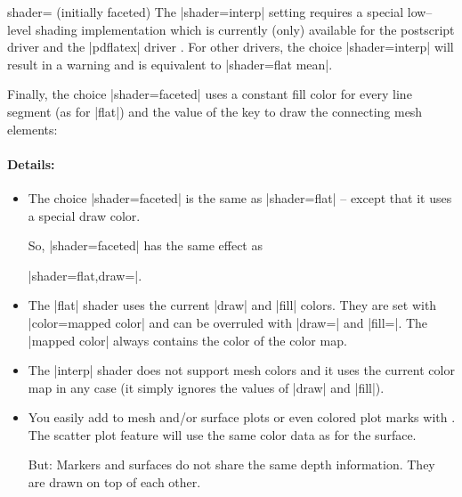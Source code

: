 \begin{pgfplotskey}{shader= (initially faceted)}
	The |shader=interp| setting requires a special low--level shading implementation which is currently (only) available for the postscript driver  and the |pdflatex| driver . For other drivers, the choice |shader=interp| will result in a warning and is equivalent to |shader=flat mean|.


	Finally, the choice |shader=faceted| uses a constant fill color for every line segment (as for |flat|) and the value of the key  to draw the connecting mesh elements:
\pgfplotsexpensiveexample
\begin{codeexample}[]
\end{codeexample}


	\paragraph{Details:}
	\begin{itemize}
		\item The choice |shader=faceted| is the same as |shader=flat| -- except that it uses a special draw color.
		
		So, |shader=faceted| has the same effect as 
		
		|shader=flat,draw=|.

		\item The |flat| shader uses the current |draw| and |fill| colors. They are set with |color=mapped color| and can be overruled with |draw=| and |fill=|. The |mapped color| always contains the color of the color map. 
		
		\item The |interp| shader does not support mesh colors and it uses the current color map in any case (it simply ignores the values of |draw| and |fill|).

		\item You easily add  to mesh and/or surface plots or even colored plot marks with . The scatter plot feature will use the same color data as for the surface.

		But: Markers and surfaces do not share the same depth information. They are drawn on top of each other.


\end{itemize}
\end{pgfplotskey}
